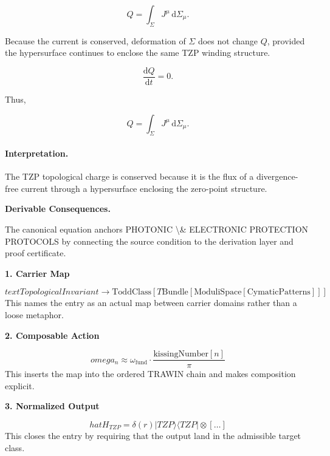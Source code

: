 \begin{equation}
Q
=
\int_{\Sigma}
J^\mu
\,\mathrm{d}\Sigma_\mu .
\end{equation}

Because the current is conserved, deformation of $\Sigma$ does not change $Q$, provided the hypersurface continues to enclose the same TZP winding structure.

\begin{equation}
\frac{\mathrm{d}Q}{\mathrm{d}t}=0 .
\end{equation}

Thus,

\begin{equation}
\boxed{
Q
=
\int_{\Sigma}
J^\mu
\,\mathrm{d}\Sigma_\mu .
}
\end{equation}

\paragraph{Interpretation.}
The TZP topological charge is conserved because it is the flux of a divergence-free current through a hypersurface enclosing the zero-point structure.

\par\vspace{0.35em}
\noindent\textbf{Derivable Consequences.}\quad
\begingroup
\footnotesize
\raggedright
The canonical equation anchors PHOTONIC \textbackslash{}\& ELECTRONIC PROTECTION PROTOCOLS by connecting the source condition to the derivation layer and proof certificate.
\par\endgroup

\noindent\textbf{1. Carrier Map}\par
\[
text{TopologicalInvariant} \to \text{ToddClass}[T\text{Bundle}[\text{ModuliSpace}[\text{CymaticPatterns}]]]
\]
\noindent This names the entry as an actual map between carrier domains rather than a loose metaphor.\par
\noindent\textbf{2. Composable Action}\par
\[
omega_n \approx \omega_{\text{fund}} \cdot \frac{\text{kissingNumber}[n]}{\pi}
\]
\noindent This inserts the map into the ordered TRAWIN chain and makes composition explicit.\par
\noindent\textbf{3. Normalized Output}\par
\[
hat{H}_{TZP} = \delta(r)|TZP\rangle\langle TZP| \otimes [ \dots ]
\]
\noindent This closes the entry by requiring that the output land in the admissible target class.\par

